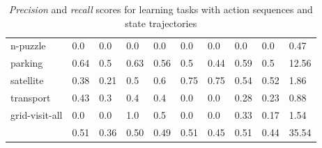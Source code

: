 \begin{table}[hbt!]
\begin{center}
\begin{tabular}{l|l|l|l|l|l|l||l|l|l|}
				n-puzzle & 0.0 & 0.0 & 0.0 & 0.0 & 0.0 & 0.0 & 0.0 & 0.0& 0.47 \\ %
				parking & 0.64 & 0.5 & 0.63 & 0.56 & 0.5 & 0.44 & 0.59 & 0.5& 12.56 \\ %
				satellite & 0.38 & 0.21 & 0.5 & 0.6 & 0.75 & 0.75 & 0.54 & 0.52& 1.86 \\ %
				transport & 0.43 & 0.3 & 0.4 & 0.4 & 0.0 & 0.0 & 0.28 & 0.23& 0.88 \\ %
				grid-visit-all & 0.0 & 0.0 & 1.0 & 0.5 & 0.0 & 0.0 & 0.33 & 0.17& 1.54 \\ %
				\hline
				\bf & 0.51& 0.36 & 0.50 & 0.49 & 0.51 & 0.45 & 0.51 & 0.44 & 35.54 \\
			\end{tabular}
			
		\end{center}
	\caption{\small {\em Precision} and {\em recall} scores for learning tasks with \NO action sequences and \NO state trajectories}
	\label{tab:results_minimum_0_0}
\end{table}


